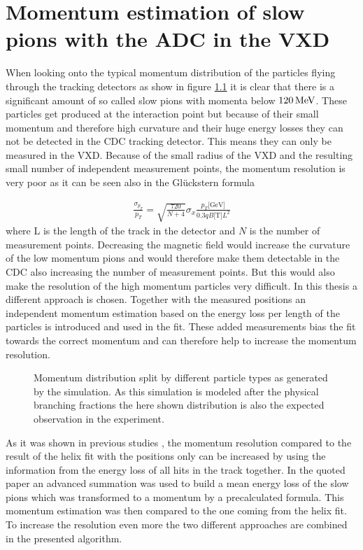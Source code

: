 \newcommand{\dedx}{$\mathrm d E / \mathrm d x$}
\chapter{Momentum estimation of slow pions with the ADC in the VXD}

When looking onto the typical momentum distribution of the particles flying through the tracking detectors as show in figure \ref{fig-particles-momentum} it is clear that there is a significant amount of so called slow pions with momenta below $\unit[120]{MeV}$. These particles get produced at the interaction point but because of their small momentum and therefore high curvature and their huge energy losses they can not be detected in the CDC tracking detector. This means they can only be measured in the VXD. Because of the small radius of the VXD and the resulting small number of independent measurement points, the momentum resolution is very poor as it can be seen also in the Glückstern formula 

\begin{align*}
 \frac{\sigma_{p_T}}{p_T} = \sqrt{\frac{720}{N + 4}} \sigma_x \frac{p_T \text{[GeV]}}{0.3 q B \text{[T]} L^2}
\end{align*}
where L is the length of the track in the detector and $N$ is the number of measurement points. Decreasing the magnetic field would increase the curvature of the low momentum pions and would therefore make them detectable in the CDC also increasing the number of measurement points. But this would also make the resolution of the high momentum particles very difficult. In this thesis a different approach is chosen. Together with the measured positions an independent momentum estimation based on the energy loss per length of the particles is introduced and used in the fit. These added measurements bias the fit towards the correct momentum and can therefore help to increase the momentum resolution.

\begin{figure}
 \centering
 \caption{Momentum distribution split by different particle types as generated by the simulation. As this simulation is modeled after the physical branching fractions the here shown distribution is also the expected observation in the experiment.}
 \label{fig-particles-momentum}
\end{figure}

As it was shown in previous studies \cite{robert}, the momentum resolution compared to the result of the helix fit with the positions only can be increased by using the information from the energy loss of all hits in the track together. In the quoted paper an advanced summation was used to build a mean energy loss of the slow pions which was transformed to a momentum by a precalculated formula. This momentum estimation was then compared to the one coming from the helix fit. To increase the resolution even more the two different approaches are combined in the presented algorithm.

